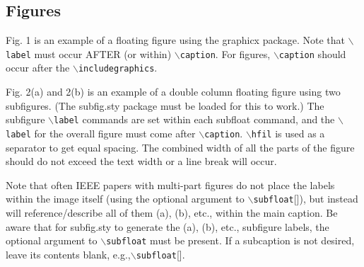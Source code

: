 \subsection{Figures}
Fig. 1 is an example of a floating figure using the graphicx package.
Note that $\backslash${\tt{label}} must occur AFTER (or within) $\backslash${\tt{caption}}.
For figures, $\backslash${\tt{caption}} should occur after the $\backslash${\tt{includegraphics}}.


Fig. 2(a) and 2(b) is an example of a double column floating figure using two subfigures.
(The subfig.sty package must be loaded for this to work.)
The subfigure $\backslash${\tt{label}} commands are set within each subfloat command,
and the $\backslash${\tt{label}} for the overall figure must come after $\backslash${\tt{caption}}.
$\backslash${\tt{hfil}} is used as a separator to get equal spacing.
The combined width of all the parts of the figure should do not exceed the text width or a line break will occur.
%

Note that often IEEE papers with multi-part figures do not place the labels within the image itself (using the optional argument to $\backslash${\tt{subfloat}}[]), but instead will
reference/describe all of them (a), (b), etc., within the main caption.
Be aware that for subfig.sty to generate the (a), (b), etc., subfigure
labels, the optional argument to $\backslash${\tt{subfloat}} must be present. If a
subcaption is not desired, leave its contents blank,
e.g.,$\backslash${\tt{subfloat}}[].